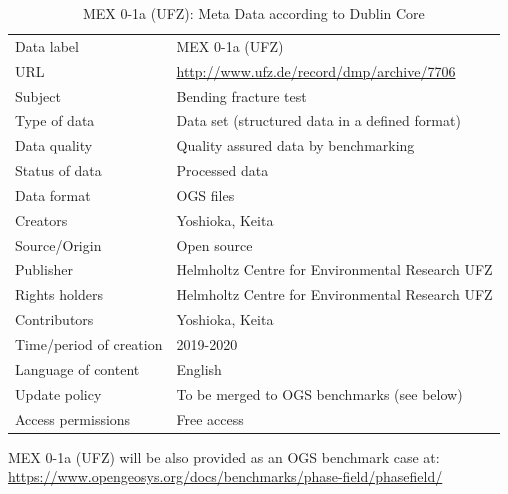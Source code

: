 \begin{table}[!ht]
\caption{MEX 0-1a (UFZ): Meta Data according to Dublin Core}
\label{tab:dms-mex0-1a}
\small
\begin{tabular}{R{3.5cm}|L{7.5cm}}
\hline
%
Data label & MEX 0-1a (UFZ) \\
URL & \url{http://www.ufz.de/record/dmp/archive/7706} \\ 
Subject  & Bending fracture test \\
Type of data  & Data set (structured data in a defined format) \\
Data quality  & Quality assured data by benchmarking \\
Status of data  & Processed data \\
Data format  & OGS files \\
Creators  & Yoshioka, Keita  \\
Source/Origin & Open source \\
Publisher  & Helmholtz Centre for Environmental Research UFZ \\
Rights holders & Helmholtz Centre for Environmental Research UFZ \\
Contributors & Yoshioka, Keita \\
Time/period of creation & 2019-2020 \\
Language of content & English \\
Update policy & To be merged to OGS benchmarks (see below) \\
Access permissions & Free access \\
%
\hline
\end{tabular}
\end{table}

MEX 0-1a (UFZ) will be also provided as an OGS benchmark case at:\\
\small
\url{https://www.opengeosys.org/docs/benchmarks/phase-field/phasefield/}
\normalsize




